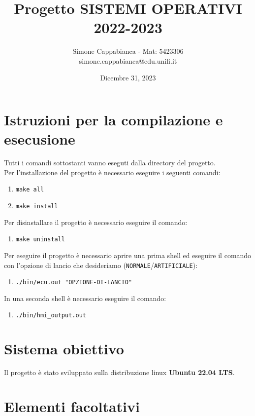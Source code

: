 \documentclass[12pt]{article}
\title{Progetto SISTEMI OPERATIVI 2022-2023}
\author{Simone Cappabianca - Mat: 5423306 \\  simone.cappabianca@edu.unifi.it}
\date{Dicembre 31, 2023}
\begin{document}
\maketitle
\newpage

\tableofcontents
\newpage

\section{Istruzioni per la compilazione e esecusione}
Tutti i comandi sottostanti vanno eseguti dalla directory del progetto. \\
Per l'installazione del progetto \`{e} necessario eseguire i seguenti comandi:
\begin{enumerate}
    \item \texttt{make all}
    \item \texttt{make install}
\end{enumerate}
Per disinstallare il progetto \`{e} necessario eseguire il comando:
\begin{enumerate}
    \item \texttt{make uninstall}
\end{enumerate}
Per eseguire il progetto \`{e} necessario aprire una prima shell ed eseguire il
comando con l'opzione di lancio che desideriamo (\texttt{NORMALE}/\texttt{ARTIFICIALE}):
\begin{enumerate}
    \item \texttt{./bin/ecu.out "OPZIONE-DI-LANCIO"}
\end{enumerate}
In una seconda shell \`{e} necessario eseguire il comando:
\begin{enumerate}
    \item \texttt{./bin/hmi\_output.out}
\end{enumerate}

\section{Sistema obiettivo}
Il progetto \`{e} stato sviluppato sulla distribuzione linux {\bf Ubuntu 22.04 LTS}.

\section{Elementi facoltativi}
\end{document}
